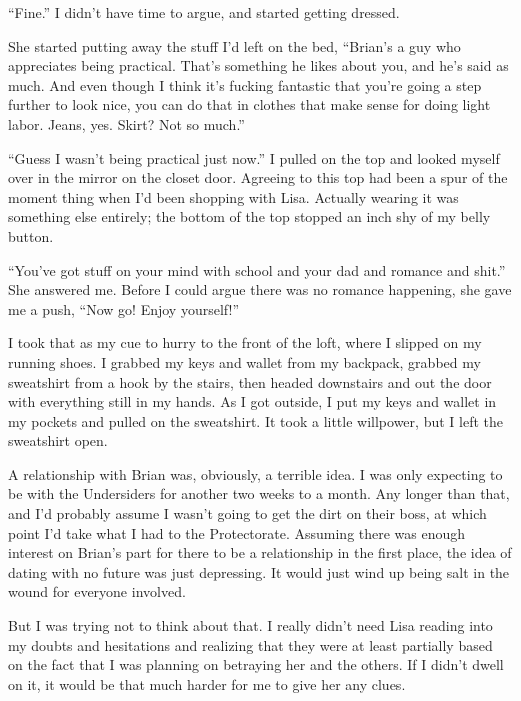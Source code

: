 ``Fine.''  I didn't have time to argue, and started getting dressed.



She started putting away the stuff I'd left on the bed, ``Brian's a guy who appreciates being practical.  That's something he likes about you, and he's said as much.  And even though I think it's fucking fantastic that you're going a step further to look nice, you can do that in clothes that make sense for doing light labor.  Jeans, yes.  Skirt?  Not so much.''



``Guess I wasn't being practical just now.''  I pulled on the top and looked myself over in the mirror on the closet door.  Agreeing to this top had been a spur of the moment thing when I'd been shopping with Lisa.  Actually wearing it was something else entirely; the bottom of the top stopped an inch shy of my belly button.



``You've got stuff on your mind with school and your dad and romance and shit.''  She answered me.  Before I could argue there was no romance happening, she gave me a push, ``Now go!  Enjoy yourself!''



I took that as my cue to hurry to the front of the loft, where I slipped on my running shoes.  I grabbed my keys and wallet from my backpack, grabbed my sweatshirt from a hook by the stairs, then headed downstairs and out the door with everything still in my hands.  As I got outside, I put my keys and wallet in my pockets and pulled on the sweatshirt.  It took a little willpower, but I left the sweatshirt open.



A relationship with Brian was, obviously, a terrible idea.  I was only expecting to be with the Undersiders for another two weeks to a month.  Any longer than that, and I'd probably assume I wasn't going to get the dirt on their boss, at which point I'd take what I had to the Protectorate.  Assuming there was enough interest on Brian's part for there to be a relationship in the first place, the idea of dating with no future was just depressing.  It would just wind up being salt in the wound for everyone involved.



But I was trying not to think about that.  I really didn't need Lisa reading into my doubts and hesitations and realizing that they were at least partially based on the fact that I was planning on betraying her and the others.  If I didn't dwell on it, it would be that much harder for me to give her any clues.



